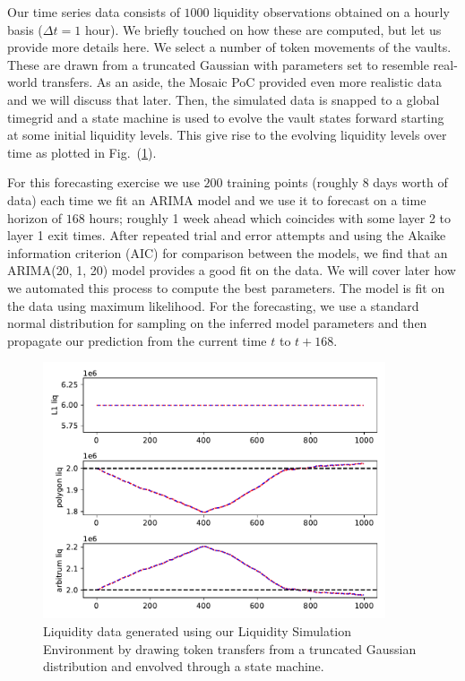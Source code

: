 Our time series data consists of $1000$ liquidity observations obtained on a hourly basis ($\Delta t = 1$ hour).
%
We briefly touched on how these are computed, but let us provide more details here. We select a number of token movements of the vaults. These are drawn from a truncated Gaussian with parameters set to resemble real-world transfers. As an aside, the Mosaic PoC provided even more realistic data and we will discuss that later.
%
Then, the simulated data is snapped to a global timegrid and a state machine is used to evolve the vault states forward starting at some initial liquidity levels. This give rise to the evolving liquidity levels over time as plotted in Fig.~(\ref{fig:liq_data}).

For this forecasting exercise we use $200$ training points (roughly 8 days worth of data) each time we fit an ARIMA model and we use it to forecast on a time horizon of $168$ hours; roughly 1 week ahead which coincides with some layer 2 to layer 1 exit times.%
After repeated trial and error attempts and using the Akaike information criterion (AIC) for comparison between the models, we find that an ARIMA(20, 1, 20) model provides a good fit on the data.
%
We will cover later how we automated this process to compute the best parameters.
%
The model is fit on the data using maximum likelihood. For the forecasting, we use a standard normal distribution for sampling on the inferred model parameters and then propagate our prediction from the current time $t$ to $t + 168$.
%
\begin{figure}[h]
    \centering
    \includegraphics[width=0.9\textwidth]{images/lse_results_feemodel_3_20_20211015_18_59_40_412997.pdf}
    \caption{Liquidity data generated using our Liquidity Simulation Environment by drawing token transfers from a truncated Gaussian distribution and envolved through a state machine.}
    \label{fig:liq_data}
\end{figure}
